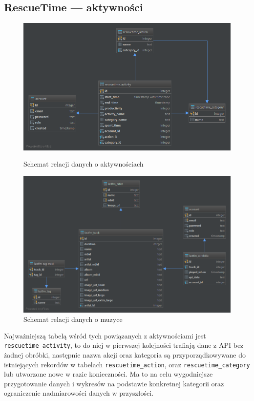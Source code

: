 \documentclass[openright]{xmgr}
\begin{document}
    \subsection*{RescueTime --- aktywności}
    \begin{figure}
        \includegraphics[width=\linewidth]{fig/db-rescuetime-schema.png}
        \caption{Schemat relacji danych o aktywnościach}
        \label{fig:db-rescuetime-schema}

        \vspace*{\floatsep}%

        \includegraphics[width=\linewidth]{fig/db-lastfm-schema.png}
        \caption{Schemat relacji danych o muzyce}
        \label{fig:db-lastfm-schema}

    \end{figure}

    Najważniejszą tabelą wśród tych powiązanych z aktywnościami jest \verb|rescuetime_activity|,
    to do niej w pierwszej kolejności trafiają dane z API bez żadnej obróbki,
    następnie nazwa akcji oraz kategoria są przyporządkowywane do istniejących rekordów w tabelach
    \verb|rescuetime_action|, oraz \verb|rescuetime_category| lub utworzone nowe w razie konieczności.
    Ma to na celu wygodniejsze przygotowanie danych i wykresów na podstawie konkretnej kategorii
    oraz ograniczenie nadmiarowości danych w przyszłości.
\end{document}
